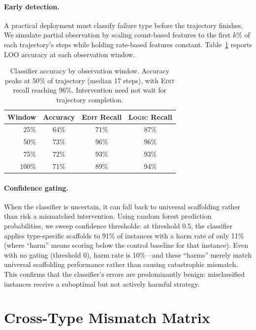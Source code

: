 \documentclass[11pt]{article}
\begin{document}
\paragraph{Early detection.}
A practical deployment must classify failure type before the trajectory finishes.
We simulate partial observation by scaling count-based features to the first $k$\% of each trajectory's steps while holding rate-based features constant.
Table~\ref{tab:early} reports LOO accuracy at each observation window.

\begin{table}[t]
\centering
\small
\begin{tabular}{@{}rccc@{}}
\toprule
\textbf{Window} & \textbf{Accuracy} & \textbf{\textsc{Edit} Recall} & \textbf{\textsc{Logic} Recall} \\
\midrule
25\% & 64\% & 71\% & 87\% \\
50\% & 73\% & 96\% & 96\% \\
75\% & 72\% & 93\% & 93\% \\
100\% & 71\% & 89\% & 94\% \\
\bottomrule
\end{tabular}
\caption{Classifier accuracy by observation window. Accuracy peaks at 50\% of trajectory (median 17 steps), with \textsc{Edit} recall reaching 96\%. Intervention need not wait for trajectory completion.}
\label{tab:early}
\end{table}

\paragraph{Confidence gating.}
When the classifier is uncertain, it can fall back to universal scaffolding rather than risk a mismatched intervention.
Using random forest prediction probabilities, we sweep confidence thresholds:
at threshold 0.5, the classifier applies type-specific scaffolds to 91\% of instances with a harm rate of only 11\% (where ``harm'' means scoring below the control baseline for that instance).
Even with no gating (threshold 0), harm rate is 10\%---and these ``harms'' merely match universal scaffolding performance rather than causing catastrophic mismatch.
This confirms that the classifier's errors are predominantly benign: misclassified instances receive a suboptimal but not actively harmful strategy.

\section{Cross-Type Mismatch Matrix}
\label{app:cross-type}
\end{document}

